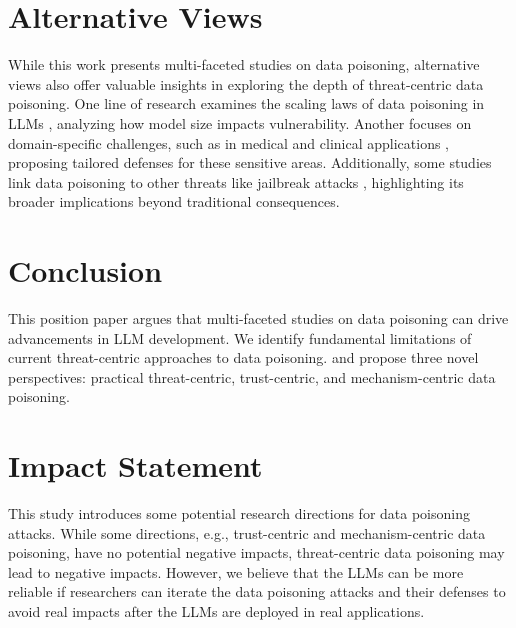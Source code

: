 \section{Alternative Views}

While this work presents multi-faceted studies on data poisoning, alternative views also offer valuable insights in exploring the depth of threat-centric data poisoning. One line of research examines the scaling laws of data poisoning in LLMs \citep{bowen2024scaling}, analyzing how model size impacts vulnerability. Another focuses on domain-specific challenges, such as in medical and clinical applications \citep{alber2025medical, das2024exposing}, proposing tailored defenses for these sensitive areas. Additionally, some studies link data poisoning to other threats like jailbreak attacks \citep{rando2023universal}, highlighting its broader implications beyond traditional consequences.

\section{Conclusion}
This position paper argues that multi-faceted studies on data poisoning can drive advancements in LLM development. 
We identify fundamental limitations of current threat-centric approaches to data poisoning.
and propose three novel perspectives: practical threat-centric, trust-centric, and mechanism-centric data poisoning. 

\section*{Impact Statement}

This study introduces some potential research directions for data poisoning attacks. While some directions, e.g., trust-centric and mechanism-centric data poisoning, have no potential negative impacts, threat-centric data poisoning may lead to negative impacts. However, we believe that the LLMs can be more reliable if researchers can iterate the data poisoning attacks and their defenses to avoid real impacts after the LLMs are deployed in real applications.

